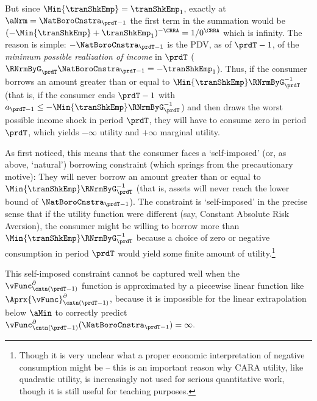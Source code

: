 But since $\Min{\tranShkEmp}=\tranShkEmp_{1}$, exactly at $\aNrm=\NatBoroCnstra_{\prdT-1}$ the first term in the summation would be $(-\Min{\tranShkEmp}+\tranShkEmp_{1})^{-\CRRA}=1/0^{\CRRA}$ which is infinity.  The reason is simple: $-\NatBoroCnstra_{\prdT-1}$ is the PDV, as of $\prdT-1$, of the \emph{minimum possible realization of income} in $\prdT$ ($\RNrmByG_{\prdT}\NatBoroCnstra_{\prdT-1} = -\tranShkEmp_{1}$).  Thus, if the consumer borrows an amount greater than or equal to $\Min{\tranShkEmp}\RNrmByG_{\prdT}^{-1}$ (that is, if the consumer ends $\prdT-1$ with $a_{\prdT-1} \leq -\Min{\tranShkEmp}\RNrmByG_{\prdT}^{-1}$) and then draws the worst possible income shock in period $\prdT$, they will have to consume zero in period $\prdT$, which yields $-\infty$ utility and $+\infty$ marginal utility.

As \cite{zeldesStochastic} first noticed, this means that the consumer faces a `self-imposed' (or, as above, `natural') borrowing constraint (which springs from the precautionary motive): They will never borrow an amount greater than or equal to $\Min{\tranShkEmp}\RNrmByG_{\prdT}^{-1}$ (that is, assets will never reach the lower bound of $\NatBoroCnstra_{\prdT-1}$).  The constraint is `self-imposed' in the precise sense that if the utility function were different (say, Constant Absolute Risk Aversion), the consumer might be willing to borrow more than $\Min{\tranShkEmp}\RNrmByG_{\prdT}^{-1}$ because a choice of zero or negative consumption in period $\prdT$ would yield some finite amount of utility.\footnote{Though it is very unclear what a proper economic interpretation of negative consumption might be -- this is an important reason why CARA utility, like quadratic utility, is increasingly not used for serious quantitative work, though it is still useful for teaching purposes.}

This self-imposed constraint cannot be captured well when the $\vFunc^{\partial}_{{\cntn}(\prdT-1)}$ function is approximated by a piecewise linear function like $\Aprx{\vFunc}^{\partial}_{{\cntn}(\prdT-1)}$, because it is impossible for the linear extrapolation below $\aMin$ to correctly predict $\vFunc^{\partial}_{{\cntn}(\prdT-1)}(\NatBoroCnstra_{\prdT-1})=\infty.$ %


